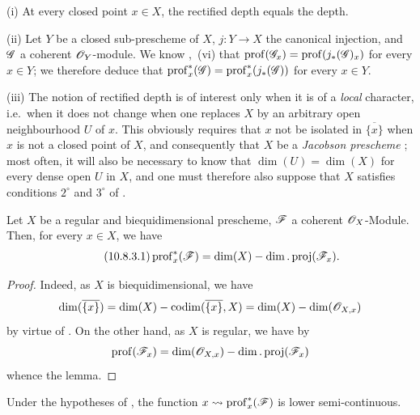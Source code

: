 \begin{remarks}[10.8.2]
\label{IV.10.8.2}
(i) At every closed point $x\in X$, the rectified depth equals the depth.

(ii) Let $Y$ be a closed sub-prescheme of $X$, $j:Y\to X$ the canonical injection, and $\mathscr{G}$ a coherent $\mathscr{O}_Y$-module.
We know ,~(vi) that $\operatorname{prof}(\mathscr{G}_x)=\operatorname{prof}(j_*(\mathscr{G})_x)$ for every $x\in Y$; we therefore deduce that $\operatorname{prof}^*_x(\mathscr{G})=\operatorname{prof}^*_x(j_*(\mathscr{G}))$ for every $x\in Y$.

(iii) The notion of rectified depth is of interest only when it is of a \emph{local} character, i.e.\ when it does not change when one replaces $X$ by an arbitrary open neighbourhood $U$ of $x$.
This obviously requires that $x$ not be isolated in $\overline{\{x\}}$ when $x$ is not a closed point of $X$, and consequently that $X$ be a \emph{Jacobson prescheme} ; most often, it will also be necessary to know that $\dim(U)=\dim(X)$ for every dense open $U$ in $X$, and one must therefore also suppose that $X$ satisfies conditions $2^\circ$ and $3^\circ$ of .
\end{remarks}

\begin{lemma}[10.8.3]
\label{IV.10.8.3}
Let $X$ be a regular and biequidimensional prescheme, $\mathscr{F}$ a coherent $\mathscr{O}_X$-Module.
Then, for every $x\in X$, we have
\begin{equation}
\label{IV.10.8.3.1}
\tag{10.8.3.1}
\operatorname{prof}^*_x(\mathscr{F})=\dim(X)-\dim.\operatorname{proj}(\mathscr{F}_x).
\end{equation}
\end{lemma}

\begin{proof}
Indeed, as $X$ is biequidimensional, we have 
\[
  \dim(\overline{\{x\}})=\dim(X)-\operatorname{codim}(\overline{\{x\}},X)=\dim(X)-\dim(\mathscr{O}_{X,x})
\]
by virtue of .
On the other hand, as $X$ is regular, we have by 
\[
  \operatorname{prof}(\mathscr{F}_x)=\dim(\mathscr{O}_{X,x})-\dim.\operatorname{proj}(\mathscr{F}_x)
\]
whence the lemma.
\end{proof}

\begin{corollary}[10.8.4]
\label{IV.10.8.4}
Under the hypotheses of , the function $x\leadsto\operatorname{prof}^*_x(\mathscr{F})$ is lower semi-continuous.
\end{corollary}

